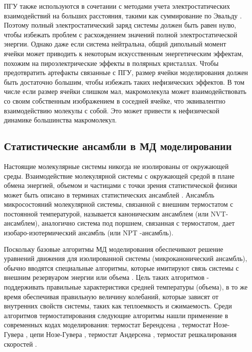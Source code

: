 ПГУ также используются в сочетании с методами учета электростатических взаимодействий на больших расстояния, такими как суммирование по Эвальду \cite{sagui_molecular_1999}. Поэтому полный электростатический заряд системы должен быть равен нулю, чтобы избежать проблем с расхождением значений полной электростатической энергии. Однако даже если система нейтральна, общий дипольный момент ячейки может приводить к некоторым искусственным энергетическим эффектам, похожим на пироэлектрические эффекты в полярных кристаллах.
Чтобы предотвратить артефакты связанные с ПГУ, размер ячейки моделирования должен быть достаточно большим, чтобы избежать таких нефизических эффектов. В том числе если размер ячейки слишком мал, макромолекула может взаимодействовать со своим собственным изображением в соседней ячейке, что эквивалентно взаимодействию молекулы с собой. Это может привести к нефизической динамике большинства макромолекул.

\subsection{Статистические ансамбли в МД моделировании}

Настоящие молекулярные системы никогда не изолированы от окружающей среды. Взаимодействие молекулярной системы с окружающей средой в плане обмена энергией, объемом и частицами с точки зрения статистической физики может быть описано в терминах статистических ансамблей \cite{landau_statistical_2000}. Ансамбль микросостояний молекулярной системы, связанной с внешним термостатом с постоянной температурой, называется каноническим ансамблем (или NVT-ансамблем), аналогично система под поршнем, связанная с термостатом, дает изобаро-изотермический ансамбль (или NPT -ансамбль).

    Поскольку базовые алгоритмы МД моделирования обеспечивают решение уравнений движения для изолированной системы (микроканонический ансамбль), обычно вводятся специальные алгоритмы, которые имитируют связь системы с внешним резервуаром энергии или объема \cite{frenkel_understanding_2002}. Цель таких алгоритмов - поддерживать правильные характеристики средней температуры (объема), в то же время обеспечивая правильную величину колебаний, которые зависят от внутренних свойств системы, таких как теплоемкость и сжимаемость.
    Среди алгоритмов термостатирования следующие алгоритмы нашли применение в современных кодах моделирования: термостат Берендсена \cite{berendsen_molecular_1984}, термостат Нозе-Гувера \cite{hoover_canonical_1985}, цепи Нозе-Гувера \cite{martyna_nose-hoover_1992}, термостат Андерсена \cite{andersen_molecular_1980}, термостат решкалирования скоростей \cite{bussi_canonical_2007}.
    
